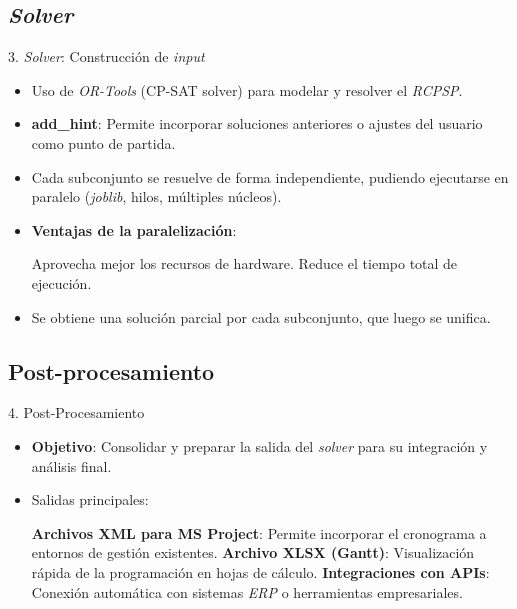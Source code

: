 \documentclass[pdfpagelabels=false, usepdftitle=false, aspectratio=169]{beamer}
\begin{document}
\subsection{\textit{Solver}}

\begin{frame}{3. \textit{Solver}: Construcción de \textit{input}}
\begin{itemize}
    \item Uso de \textit{OR-Tools} (CP-SAT solver) para modelar y resolver el \textit{RCPSP}.
    \vfill
    \item \textbf{add\_hint}: Permite incorporar soluciones anteriores o ajustes del usuario como punto de partida.
    \item Cada subconjunto se resuelve de forma independiente, pudiendo ejecutarse en paralelo (\textit{joblib}, hilos, múltiples núcleos).
    \vfill
    \item \textbf{Ventajas de la paralelización}:
    \begin{itemize}
        \arrowitem Aprovecha mejor los recursos de hardware.
        \arrowitem Reduce el tiempo total de ejecución.
    \end{itemize}
    \vfill
    \item Se obtiene una solución parcial por cada subconjunto, que luego se unifica.
\end{itemize}
\vfill
\end{frame}


\subsection{Post-procesamiento}

\begin{frame}{4. Post-Procesamiento}
\begin{itemize}
    \item \textbf{Objetivo}: Consolidar y preparar la salida del \textit{solver} para su integración y análisis final.
    \vfill
    \item Salidas principales:
    \begin{itemize}
        \arrowitem \textbf{Archivos XML para MS Project}: Permite incorporar el cronograma a entornos de gestión existentes.
        \arrowitem \textbf{Archivo XLSX (Gantt)}: Visualización rápida de la programación en hojas de cálculo.
        \arrowitem \textbf{Integraciones con APIs}: Conexión automática con sistemas \textit{ERP} o herramientas empresariales.
    \end{itemize}
\end{itemize}
\vfill
\end{frame}
\end{document}
